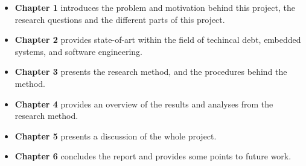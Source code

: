 \begin{itemize}
	\item \textbf{Chapter 1} introduces the problem and motivation behind this project, the research questions and the different parts of this project.
	\item \textbf{Chapter 2} provides state-of-art within the field of techincal debt, embedded systems, and software engineering.
	\item \textbf{Chapter 3} presents the research method, and the procedures behind the method.
	\item \textbf{Chapter 4} provides an overview of the results and analyses from the research method.
	\item \textbf{Chapter 5} presents a discussion of the whole project.
	\item \textbf{Chapter 6} concludes the report and provides some points to future work. 
\end{itemize}

